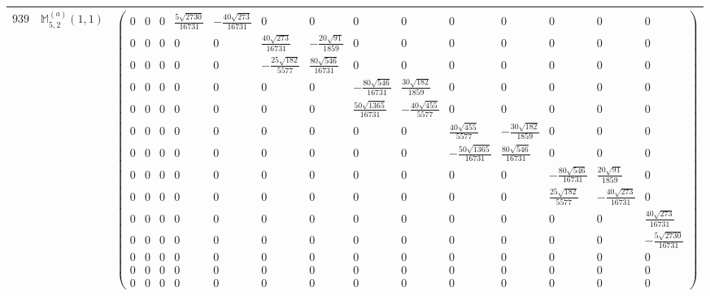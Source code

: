 \documentclass[fleqn,8pt,landscape]{jsarticle}
\begin{document}
\begin{center}
\begin{longtable}{ccc}
$ 939 $ & $ \mathbb{M}_{5,2}^{(a)}(1,1) $ & $ \begin{pmatrix} 0 & 0 & 0 & \frac{5 \sqrt{2730}}{16731} & - \frac{40 \sqrt{273}}{16731} & 0 & 0 & 0 & 0 & 0 & 0 & 0 & 0 & 0 \\ 0 & 0 & 0 & 0 & 0 & \frac{40 \sqrt{273}}{16731} & - \frac{20 \sqrt{91}}{1859} & 0 & 0 & 0 & 0 & 0 & 0 & 0 \\ 0 & 0 & 0 & 0 & 0 & - \frac{25 \sqrt{182}}{5577} & \frac{80 \sqrt{546}}{16731} & 0 & 0 & 0 & 0 & 0 & 0 & 0 \\ 0 & 0 & 0 & 0 & 0 & 0 & 0 & - \frac{80 \sqrt{546}}{16731} & \frac{30 \sqrt{182}}{1859} & 0 & 0 & 0 & 0 & 0 \\ 0 & 0 & 0 & 0 & 0 & 0 & 0 & \frac{50 \sqrt{1365}}{16731} & - \frac{40 \sqrt{455}}{5577} & 0 & 0 & 0 & 0 & 0 \\ 0 & 0 & 0 & 0 & 0 & 0 & 0 & 0 & 0 & \frac{40 \sqrt{455}}{5577} & - \frac{30 \sqrt{182}}{1859} & 0 & 0 & 0 \\ 0 & 0 & 0 & 0 & 0 & 0 & 0 & 0 & 0 & - \frac{50 \sqrt{1365}}{16731} & \frac{80 \sqrt{546}}{16731} & 0 & 0 & 0 \\ 0 & 0 & 0 & 0 & 0 & 0 & 0 & 0 & 0 & 0 & 0 & - \frac{80 \sqrt{546}}{16731} & \frac{20 \sqrt{91}}{1859} & 0 \\ 0 & 0 & 0 & 0 & 0 & 0 & 0 & 0 & 0 & 0 & 0 & \frac{25 \sqrt{182}}{5577} & - \frac{40 \sqrt{273}}{16731} & 0 \\ 0 & 0 & 0 & 0 & 0 & 0 & 0 & 0 & 0 & 0 & 0 & 0 & 0 & \frac{40 \sqrt{273}}{16731} \\ 0 & 0 & 0 & 0 & 0 & 0 & 0 & 0 & 0 & 0 & 0 & 0 & 0 & - \frac{5 \sqrt{2730}}{16731} \\ 0 & 0 & 0 & 0 & 0 & 0 & 0 & 0 & 0 & 0 & 0 & 0 & 0 & 0 \\ 0 & 0 & 0 & 0 & 0 & 0 & 0 & 0 & 0 & 0 & 0 & 0 & 0 & 0 \\ 0 & 0 & 0 & 0 & 0 & 0 & 0 & 0 & 0 & 0 & 0 & 0 & 0 & 0 \end{pmatrix} $ \\ \hline

\end{longtable}
\end{center}
\end{document}
